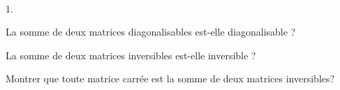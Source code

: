 \documentclass[11pt]{article}%
\begin{document}

\begin{exerciceSP}~
  \begin{noliste}{1.}
    \setlength{\itemsep}{2mm}
  \item La somme de deux matrices diagonalisables est-elle
    diagonalisable ?
  \item La somme de deux matrices inversibles est-elle inversible ?
  \item Montrer que toute matrice carrée est la somme de deux matrices
    inversibles?
  \end{noliste}
\end{exerciceSP}




\end{document}
